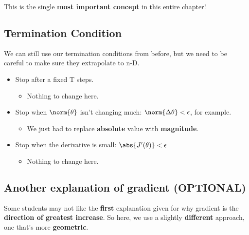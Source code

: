         This is the single \textbf{most important concept} in this entire chapter!
        
        
    \subsection{Termination Condition}
    
        We can still use our termination conditions from before, but we need to be careful to make sure they extrapolate to n-D.
        
        \begin{itemize}
            \item Stop after a fixed T steps.
                \begin{itemize}
                    \item Nothing to change here. 
                \end{itemize}
                
            \item Stop when $\norm{\theta}$ isn't changing much: $\norm{\Delta \theta} < \epsilon$, for example.
                \begin{itemize}
                    \item We just had to replace \textbf{absolute} value with \textbf{magnitude}.
                \end{itemize}
                
            \item Stop when the derivative is small: $\abs{J'(\theta)} < \epsilon$
            
                \begin{itemize}
                    \item Nothing to change here.
                \end{itemize}
        \end{itemize}

    \subsection{Another explanation of gradient (OPTIONAL)}
    
        Some students may not like the \textbf{first} explanation given for why gradient is the \textbf{direction of greatest increase}. So here, we use a slightly \textbf{different} approach, one that's more \textbf{geometric}. 
        
